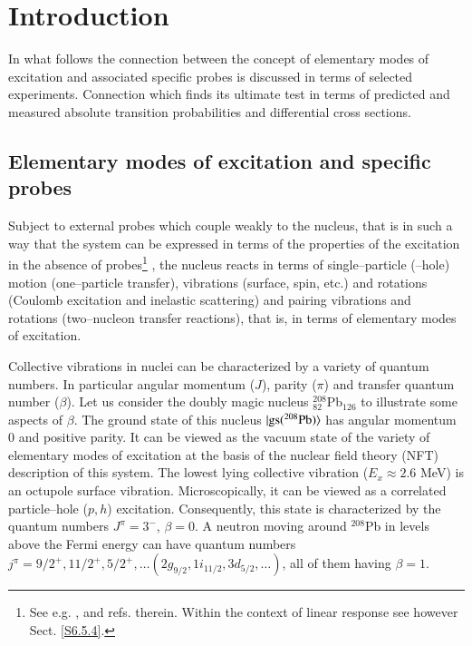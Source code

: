 \chapter{Introduction}\label{intro}












In what follows the connection between the concept of elementary modes of excitation and associated specific probes is discussed in terms of selected experiments. Connection which finds its ultimate test in terms of predicted and measured absolute transition probabilities and differential cross sections. 
 \section{Elementary modes of excitation and specific probes}\label{S1.1}
Subject to external probes which couple weakly to the nucleus, that is in such a way that the system can be expressed in terms of the properties of the excitation in the absence of probes\footnote{See e.g. \cite{Pines:66},\cite{Bohr:75} and refs. therein. Within the context of linear response see however Sect. \ref{S6.5.4}.} , the nucleus reacts  in terms  of single--particle (--hole) motion (one--particle transfer), vibrations (surface, spin, etc.) and rotations (Coulomb excitation and inelastic scattering) and pairing vibrations and rotations (two--nucleon transfer reactions), that is, in terms of elementary modes of excitation.


Collective vibrations in nuclei can be characterized by a variety of quantum numbers. In particular angular momentum ($J$), parity ($\pi$) and transfer quantum number ($\beta$). Let us consider the doubly magic nucleus $^{208}_{82}$Pb$_{126}$ to illustrate some aspects of $\beta$. The ground state of this nucleus $|{\text{gs}(^{208}\text{Pb})} \rangle$ has angular momentum 0 and positive parity. It can be viewed as the vacuum state of the variety of elementary modes of excitation at the basis of the nuclear field theory (NFT) description of this system. The lowest lying collective vibration ($E_x\approx2.6$ MeV) is an octupole surface vibration. Microscopically, it can be viewed as a correlated particle--hole ($p,h$) excitation. Consequently, this state is characterized by the quantum numbers $J^\pi=3^-$, $\beta=0$. A neutron moving around $^{208}$Pb in levels above the Fermi energy can have quantum numbers $j^\pi=9/2^+,11/2^+,5/2^+,\dots(2g_{9/2},1i_{11/2},3d_{5/2},\dots)$, all of them having  $\beta=1$.


